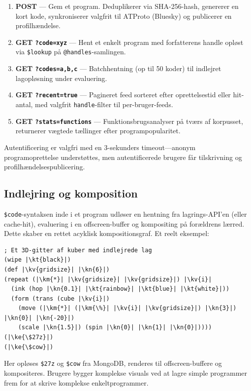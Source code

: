 \documentclass[10pt,letterpaper,twocolumn]{article}
\newcommand{\kn}[1]{\textcolor{klnum}{#1}}
\newcommand{\kt}[1]{\textcolor{klstr}{#1}}
\newcommand{\kv}[1]{\textcolor{klvar}{#1}}
\newcommand{\ke}[1]{\textcolor{klembed}{\textbf{#1}}}
\newcommand{\km}[1]{\textcolor{klmath}{#1}}
\begin{document}
\begin{enumerate}
  \item \textbf{POST} --- Gem et program. Deduplikerer via SHA-256-hash, genererer en kort kode, synkroniserer valgfrit til ATProto (Bluesky) og publicerer en profilhændelse.
  \item \textbf{GET \texttt{?code=xyz}} --- Hent et enkelt program med forfatterens handle opløst via \texttt{\$lookup} på \texttt{@handles}-samlingen.
  \item \textbf{GET \texttt{?codes=a,b,c}} --- Batchhentning (op til 50 koder) til indlejret lagopløsning under evaluering.
  \item \textbf{GET \texttt{?recent=true}} --- Pagineret feed sorteret efter oprettelsestid eller hit-antal, med valgfrit \texttt{handle}-filter til per-bruger-feeds.
  \item \textbf{GET \texttt{?stats=functions}} --- Funktionsbrugsanalyser på tværs af korpusset, returnerer vægtede tællinger efter programpopularitet.
\end{enumerate}

Autentificering er valgfri med en 3-sekunders timeout---anonym programoprettelse understøttes, men autentificerede brugere får tilskrivning og profilhændelsespublicering.

\subsection{Indlejring og komposition}

\texttt{\$code}-syntaksen inde i et program udløser en hentning fra lagrings-API'en (eller cache-hit), evaluering i en offscreen-buffer og kompositing på forældrens lærred. Dette skaber en rettet acyklisk kompositionsgraf. Et reelt eksempel:

\begin{lstlisting}
; Et 3D-gitter af kuber med indlejrede lag
(wipe |\kt{black}|)
(def |\kv{gridsize}| |\kn{6}|)
(repeat (|\km{*}| |\kv{gridsize}| |\kv{gridsize}|) |\kv{i}|
  (ink (hop |\kn{0.1}| |\kt{rainbow}| |\kt{blue}| |\kt{white}|))
  (form (trans (cube |\kv{i}|)
    (move (|\km{*}| (|\km{\%}| |\kv{i}| |\kv{gridsize}|) |\kn{3}|) |\kn{0}| |\kn{-20}|)
    (scale |\kn{1.5}|) (spin |\kn{0}| |\kn{1}| |\kn{0}|))))
(|\ke{\$27z}|)
(|\ke{\$cow}|)
\end{lstlisting}

Her opløses \texttt{\$27z} og \texttt{\$cow} fra MongoDB, renderes til offscreen-buffere og kompositeres. Brugere bygger komplekse visuals ved at lagre simple programmer frem for at skrive komplekse enkeltprogrammer.
\end{document}
